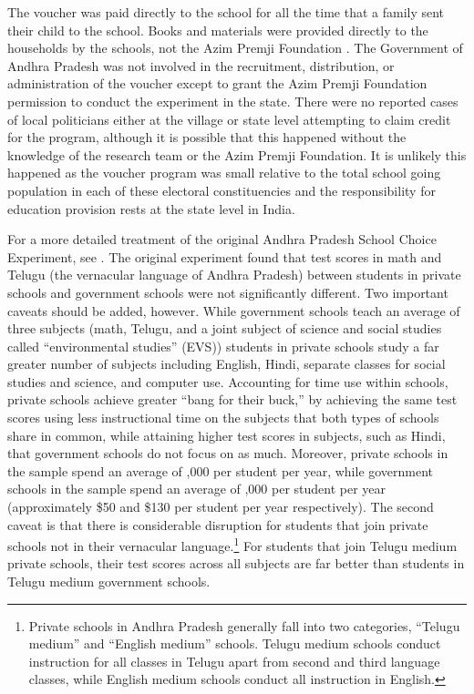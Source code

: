 \documentclass[hidelinks, 12pt, titlepage]{article}
\begin{document}
		The voucher was paid directly to the school for all the time that a family sent their child to the school.  Books and materials were provided directly to the households by the schools, not the Azim Premji Foundation \citep[1022]{Muralidharan2015}.  The Government of Andhra Pradesh was not involved in the recruitment, distribution, or administration of the voucher except to grant the Azim Premji Foundation permission to conduct the experiment in the state.  There were no reported cases of local politicians either at the village or state level attempting to claim credit for the program, although it is possible that this happened without the knowledge of the research team or the Azim Premji Foundation.  It is unlikely this happened as the voucher program was small relative to the total school going population in each of these electoral constituencies and the responsibility for education provision rests at the state level in India.

		For a more detailed treatment of the original Andhra Pradesh School Choice Experiment, see \cite{Muralidharan2015}.  The original experiment found that test scores in math and Telugu (the vernacular language of Andhra Pradesh) between students in private schools and government schools were not significantly different.  Two important caveats should be added, however.  While government schools teach an average of three subjects (math, Telugu, and a joint subject of science and social studies called ``environmental studies'' (EVS)) students in private schools study a far greater number of subjects including English, Hindi, separate classes for social studies and science, and computer use.  Accounting for time use within schools, private schools achieve greater ``bang for their buck,'' by achieving the same test scores using less instructional time on the subjects that both types of schools share in common, while attaining higher test scores in subjects, such as Hindi, that government schools do not focus on as much.  Moreover, private schools in the sample spend an average of ,000 per student per year, while government schools in the sample spend an average of ,000 per student per year (approximately \$50 and \$130 per student per year respectively).  The second caveat is that there is considerable disruption for students that join private schools not in their vernacular language.\footnote{Private schools in Andhra Pradesh generally fall into two categories, ``Telugu medium'' and ``English medium'' schools.  Telugu medium schools conduct instruction for all classes in Telugu apart from second and third language classes, while English medium schools conduct all instruction in English.}  For students that join Telugu medium private schools, their test scores across all subjects are far better than students in Telugu medium government schools.
\end{document}
